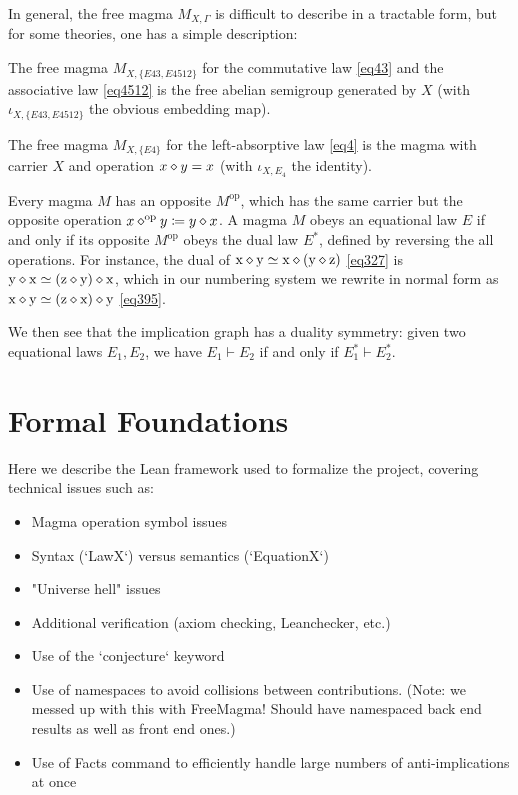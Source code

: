 In general, the free magma $M_{X,\Gamma}$ is difficult to describe in a tractable form, but for some theories, one has a simple description:

\begin{example}\label{semi-group} The free magma $M_{X,\{E43, E4512\}}$ for the commutative law \eqref{eq43} and the associative law \eqref{eq4512} is the free abelian semigroup generated by $X$ (with $\iota_{X,\{E43,E4512\}}$ the obvious embedding map).
\end{example}

\begin{example}\label{left-absorb}
The free magma $M_{X,\{E4\}}$ for the left-absorptive law \eqref{eq4} is the magma with carrier $X$ and operation $x \diamond y = x$ (with $\iota_{X,E_4}$ the identity).
\end{example}


Every magma $M$ has an opposite $M^{\mathrm{op}}$, which has the same carrier but the opposite operation $x \diamond^{\mathrm{op}} y \coloneqq y \diamond x$.  A magma $M$ obeys an equational law $E$ if and only if its opposite $M^{\mathrm{op}}$ obeys the dual law $E^*$, defined by reversing the all operations.  For instance, the dual of
$\mathrm{x} \diamond \mathrm{y} \simeq \mathrm{x} \diamond (\mathrm{y} \diamond \mathrm{z})$ \eqref{eq327} is $\mathrm{y} \diamond \mathrm{x} \simeq (\mathrm{z} \diamond \mathrm{y}) \diamond \mathrm{x}$, which in our numbering system we rewrite in normal form as $\mathrm{x} \diamond \mathrm{y} \simeq (\mathrm{z} \diamond \mathrm{x}) \diamond \mathrm{y}$ \eqref{eq395}.

We then see that the implication graph has a duality symmetry: given two equational laws $E_1,E_2$, we have $E_1 \vdash E_2$ if and only if $E_1^* \vdash E_2^*$.

\section{Formal Foundations}


Here we describe the Lean framework used to formalize the project, covering technical issues such as:

\begin{itemize}
    \item Magma operation symbol issues
    \item Syntax (`LawX`) versus semantics (`EquationX`)
    \item "Universe hell" issues
    \item Additional verification (axiom checking, Leanchecker, etc.)
    \item Use of the `conjecture` keyword
    \item Use of namespaces to avoid collisions between contributions. (Note: we messed up with this with FreeMagma! Should have namespaced back end results as well as front end ones.)
    \item Use of Facts command to efficiently handle large numbers of anti-implications at once
\end{itemize}

